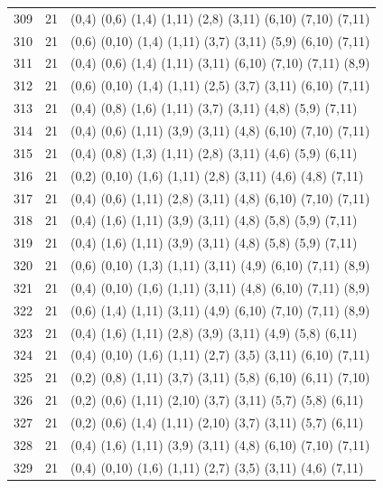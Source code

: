 \begin{appendix}
{\begin{longtable}{lll}
    309& 21 & (0,4)   (0,6)   (1,4)   (1,11)  (2,8)   (3,11)  (6,10)  (7,10)  (7,11)\\
    310& 21 & (0,6)   (0,10)  (1,4)   (1,11)  (3,7)   (3,11)  (5,9)   (6,10)  (7,11)\\
    311& 21 & (0,4)   (0,6)   (1,4)   (1,11)  (3,11)  (6,10)  (7,10)  (7,11)  (8,9)\\
    312& 21 & (0,6)   (0,10)  (1,4)   (1,11)  (2,5)   (3,7)   (3,11)  (6,10)  (7,11)\\
    313& 21 & (0,4)   (0,8)   (1,6)   (1,11)  (3,7)   (3,11)  (4,8)   (5,9)   (7,11)\\
    314& 21 & (0,4)   (0,6)   (1,11)  (3,9)   (3,11)  (4,8)   (6,10)  (7,10)  (7,11)\\
    315& 21 & (0,4)   (0,8)   (1,3)   (1,11)  (2,8)   (3,11)  (4,6)   (5,9)   (6,11)\\
    316& 21 & (0,2)   (0,10)  (1,6)   (1,11)  (2,8)   (3,11)  (4,6)   (4,8)   (7,11)\\
    317& 21 & (0,4)   (0,6)   (1,11)  (2,8)   (3,11)  (4,8)   (6,10)  (7,10)  (7,11)\\
    318& 21 & (0,4)   (1,6)   (1,11)  (3,9)   (3,11)  (4,8)   (5,8)   (5,9)   (7,11)\\
    319& 21 & (0,4)   (1,6)   (1,11)  (3,9)   (3,11)  (4,8)   (5,8)   (5,9)   (7,11)\\
    320& 21 & (0,6)   (0,10)  (1,3)   (1,11)  (3,11)  (4,9)   (6,10)  (7,11)  (8,9)\\
    321& 21 & (0,4)   (0,10)  (1,6)   (1,11)  (3,11)  (4,8)   (6,10)  (7,11)  (8,9)\\
    322& 21 & (0,6)   (1,4)   (1,11)  (3,11)  (4,9)   (6,10)  (7,10)  (7,11)  (8,9)\\
    323& 21 & (0,4)   (1,6)   (1,11)  (2,8)   (3,9)   (3,11)  (4,9)   (5,8)   (6,11)\\
    324& 21 & (0,4)   (0,10)  (1,6)   (1,11)  (2,7)   (3,5)   (3,11)  (6,10)  (7,11)\\
    325& 21 & (0,2)   (0,8)   (1,11)  (3,7)   (3,11)  (5,8)   (6,10)  (6,11)  (7,10)\\
    326& 21 & (0,2)   (0,6)   (1,11)  (2,10)  (3,7)   (3,11)  (5,7)   (5,8)   (6,11)\\
    327& 21 & (0,2)   (0,6)   (1,4)   (1,11)  (2,10)  (3,7)   (3,11)  (5,7)   (6,11)\\
    328& 21 & (0,4)   (1,6)   (1,11)  (3,9)   (3,11)  (4,8)   (6,10)  (7,10)  (7,11)\\
    329& 21 & (0,4)   (0,10)  (1,6)   (1,11)  (2,7)   (3,5)   (3,11)  (4,6)   (7,11)\\

\end{longtable}}
\end{appendix}
